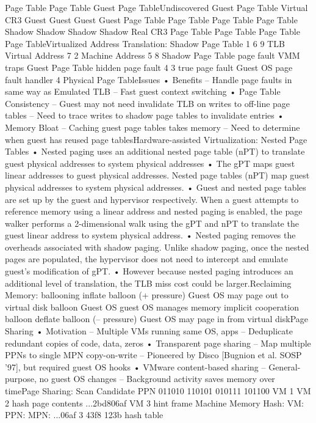 \documentclass[10pt]{article}
\begin{document}
Page Table
Page Table
Guest
Page TableUndiscovered Guest Page Table
Virtual
CR3
Guest
Guest
Guest
Guest
Page Table Page Table Page Table Page Table
Shadow Shadow Shadow Shadow
Real CR3
Page Table
Page Table
Page Table
Page TableVirtualized Address Translation:
Shadow Page Table
1
6
9
TLB
Virtual Address
7
2
Machine Address
5
8
Shadow
Page
Table
page
fault
VMM
traps
Guest
Page
Table
hidden
page
fault
4
3
true
page
fault
Guest OS
page fault
handler
4
Physical
Page
TableIssues
•  Benefits
–  Handle page faults in same way as Emulated TLB
–  Fast guest context switching
•  Page Table Consistency
–  Guest may not need invalidate TLB on writes to
off-line page tables
–  Need to trace writes to shadow page tables to
invalidate entries
•  Memory Bloat
–  Caching guest page tables takes memory
–  Need to determine when guest has reused page
tablesHardware-assisted Virtualization:
Nested Page Tables
•  Nested paging uses an additional nested page table (nPT) to translate guest
physical addresses to system physical addresses
•  The gPT maps guest linear addresses to guest physical addresses. Nested page
tables (nPT) map guest physical addresses to system physical addresses.
•  Guest and nested page tables are set up by the guest and hypervisor respectively.
When a guest attempts to reference memory using a linear address and nested
paging is enabled, the page walker performs a 2-dimensional walk using the gPT
and nPT to translate the guest linear address to system physical address.
•  Nested paging removes the overheads associated with shadow paging. Unlike
shadow paging, once the nested pages are populated, the hypervisor does not
need to intercept and emulate guest’s modification of gPT.
•  However because nested paging introduces an additional level of translation, the
TLB miss cost could be larger.Reclaiming Memory: ballooning
inflate balloon
(+ pressure)
Guest OS
may page out
to virtual disk
balloon
Guest OS
guest OS manages memory
implicit cooperation
balloon
deflate balloon
(– pressure)
Guest OS
may page in
from virtual diskPage Sharing
•  Motivation
–  Multiple VMs running same OS, apps
–  Deduplicate redundant copies of code, data,
zeros
•  Transparent page sharing
–  Map multiple PPNs to single MPN copy-on-write
–  Pioneered by Disco [Bugnion et al. SOSP ’97],
but required guest OS hooks
•  VMware content-based sharing
–  General-purpose, no guest OS changes
–  Background activity saves memory over timePage Sharing: Scan Candidate PPN
011010
110101
010111
101100
VM 1
VM 2
hash page contents
...2bd806af
VM 3
hint frame
Machine
Memory
Hash:
VM:
PPN:
MPN:
...06af
3
43f8
123b
hash
table
\end{document}
